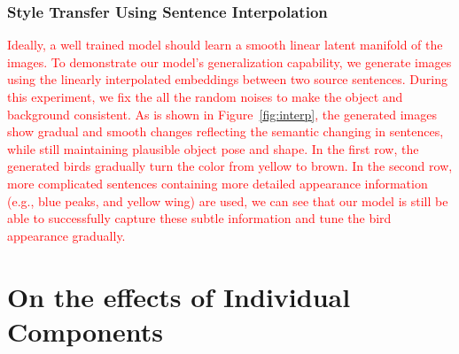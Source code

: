 \documentclass[10pt,twocolumn,letterpaper]{article}
\begin{document}
\subsubsection{Style Transfer Using Sentence Interpolation}

\textcolor{red}{Ideally, a well trained model should learn a smooth linear latent manifold of the images. To demonstrate our model's generalization capability, we generate images using the linearly interpolated embeddings between two source sentences. During this experiment, we fix the all the random noises to make the object and background consistent. As is shown in Figure~\ref{fig:interp}, the generated images show gradual and smooth changes reflecting the semantic changing in sentences, while still maintaining plausible object pose and shape. In the first row, the generated birds gradually turn the color from yellow to brown. In the second row, more complicated sentences containing more detailed appearance information (e.g., blue peaks, and yellow wing) are used, we can see that our model is still be able to successfully capture these subtle information and tune the bird appearance gradually. }






\section{On the effects of Individual Components}
\end{document}
